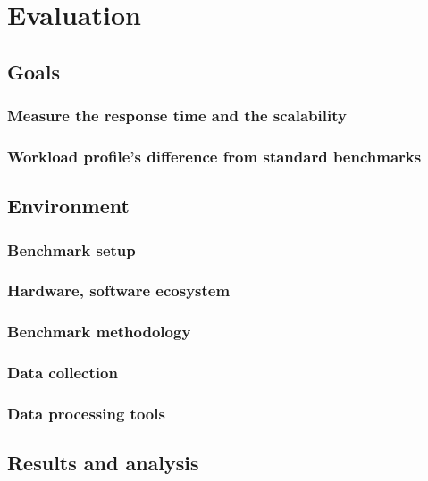 \chapter{Evaluation}

\section{Goals}


\subsection{Measure the response time and the scalability}

\subsection{Workload profile's difference from standard benchmarks}

\section{Environment}

\subsection{Benchmark setup}


\subsection{Hardware, software ecosystem}

\subsection{Benchmark methodology}

\subsection{Data collection}

\subsection{Data processing tools}

\section{Results and analysis}

